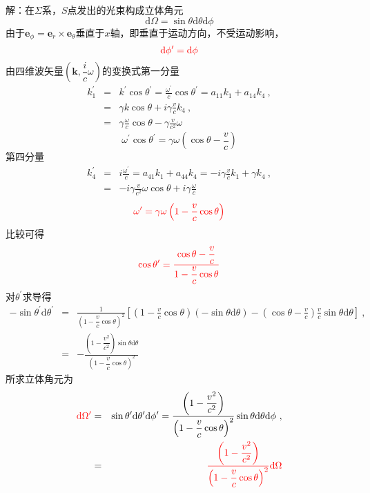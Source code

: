 \documentclass[12pt,a4paper]{article}
\renewcommand{\vec}[1]{\boldsymbol{#1}}
\newcommand{\dif}{\mathrm{d}}
\begin{document}
解：在$\Sigma$系，$S$点发出的光束构成立体角元
\begin{equation*}
\dif \Omega = \sin \theta \dif \theta \dif \phi
\end{equation*}
由于$\vec{e}_{\phi} = \vec{e}_{r}\times \vec{e}_{\theta}$垂直于$x$轴，即垂直于运动方向，不受运动影响，
\begin{equation*}
\textcolor{red}{\dif \phi^{\prime} = \dif \phi}
\end{equation*}
由四维波矢量$(\vec{k}, \dfrac{i}{c} \omega)$的变换式第一分量
\begin{eqnarray*}
k_1^{\prime} &=& k^{\prime} \cos \theta^{\prime} = \frac{\omega^{\prime}}{c} \cos \theta^{\prime} = a_{11} k_1 +a_{14} k_4 ~,\\
&=& \gamma k\cos \theta +i\gamma \frac{v}{c} k_4 ~,\\
&=& \gamma \frac{\omega}{c} \cos \theta -\gamma \frac{v}{c^2} \omega
\end{eqnarray*}
\begin{equation*}
\omega^{\prime}  \cos \theta^{\prime} = \gamma \omega \left(\cos \theta -\frac{v}{c} \right)
\end{equation*}
第四分量
\begin{eqnarray*}
k_4^{\prime} &=& i\frac{\omega^{\prime}}{c} = a_{41} k_1 +a_{44} k_4 =-i \gamma \frac{v}{c} k_1 +\gamma k_4 ~,\\
&=& -i \gamma \frac{v}{c^2} \omega \cos \theta +i\gamma \frac{\omega}{c}
\end{eqnarray*}
\begin{equation*}
\textcolor{red}{\omega^{\prime} = \gamma \omega \left(1 -\frac{v}{c} \cos \theta \right)}
\end{equation*}
比较可得
\begin{equation*}
\textcolor{red}{\cos \theta^{\prime} = \dfrac{\cos \theta -\dfrac{v}{c}}{1-\dfrac{v}{c}\cos \theta} }
\end{equation*}
对$\theta^{\prime}$求导得
\begin{eqnarray*}
-\sin \theta^{\prime} \dif \theta^{\prime} &=& \frac{1}{\left(1-\dfrac{v}{c}\cos \theta \right)^2} \left[ \left(1-\frac{v}{c} \cos \theta \right) \left(-\sin \theta \dif \theta \right) -\left(\cos \theta -\frac{v}{c} \right)\frac{v}{c} \sin \theta \dif \theta \right] ~,\\
&=& -\frac{\left(1-\dfrac{v^2}{c^2}\right)\sin \theta \dif \theta}{\left(1-\dfrac{v}{c}\cos \theta \right)^2}
\end{eqnarray*}
所求立体角元为
\begin{eqnarray*}
\textcolor{red}{\dif \Omega^{\prime}} &=& \sin \theta^{\prime} \dif \theta^{\prime} \dif \phi^{\prime} = \frac{\left(1-\dfrac{v^2}{c^2}\right)}{\left(1-\dfrac{v}{c}\cos \theta \right)^2} \sin \theta \dif \theta \dif \phi  ~,\\
&=& \textcolor{red}{\frac{\left(1-\dfrac{v^2}{c^2}\right)}{\left(1-\dfrac{v}{c}\cos \theta \right)^2} \dif \Omega}
\end{eqnarray*}
\end{document}
